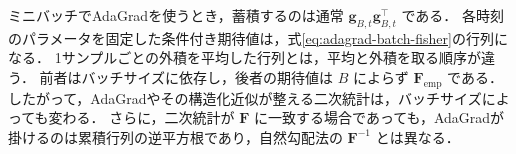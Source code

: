 \documentclass[../main.tex]{subfiles}
\begin{document}
ミニバッチでAdaGradを使うとき，蓄積するのは通常 $\bm{g}_{B,t}\bm{g}_{B,t}^\top$ である．
各時刻のパラメータを固定した条件付き期待値は，式\eqref{eq:adagrad-batch-fisher}の行列になる．
1サンプルごとの外積を平均した行列とは，平均と外積を取る順序が違う．
前者はバッチサイズに依存し，後者の期待値は $B$ によらず $\bm{F}_{\mathrm{emp}}$ である．
したがって，AdaGradやその構造化近似が整える二次統計は，バッチサイズによっても変わる．
さらに，二次統計が $\bm{F}$ に一致する場合であっても，AdaGradが掛けるのは累積行列の逆平方根であり，自然勾配法の $\bm{F}^{-1}$ とは異なる．

\chapterbibliography
\end{document}
